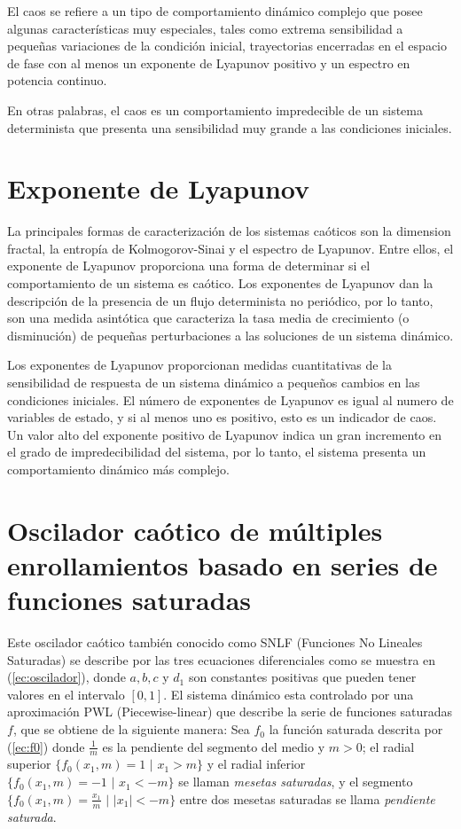\documentclass[10pt,a4paper]{article}
\begin{document}
	El caos se refiere a un tipo de comportamiento dinámico complejo que posee algunas características muy especiales, tales como extrema sensibilidad a pequeñas variaciones de la condición inicial, trayectorias encerradas en el espacio de fase con al menos un exponente de Lyapunov positivo y un espectro en potencia continuo.
	
	En otras palabras, el caos es un comportamiento impredecible de un sistema determinista que presenta una sensibilidad muy grande a las condiciones iniciales.
	
	\section{Exponente de Lyapunov}
	
	La principales formas de caracterización de los sistemas caóticos son la dimension fractal, la entropía de Kolmogorov-Sinai y el espectro de Lyapunov. Entre ellos, el exponente de Lyapunov proporciona una forma de determinar si el comportamiento de un sistema es caótico. Los exponentes de Lyapunov dan la descripción  de la presencia de un flujo determinista no periódico, por lo tanto, son una medida asintótica que caracteriza la tasa media de crecimiento (o disminución) de pequeñas
perturbaciones a las soluciones de un sistema dinámico. 

Los exponentes de Lyapunov proporcionan medidas cuantitativas de la sensibilidad de respuesta de un sistema dinámico a pequeños cambios en las condiciones iniciales. El número de exponentes de Lyapunov es igual al numero de variables de estado, y si al menos uno
es positivo, esto es un indicador de caos. Un valor alto del exponente positivo de Lyapunov indica un gran incremento en el grado de impredecibilidad del sistema, por lo tanto, el sistema presenta un comportamiento dinámico más complejo.

\section{Oscilador caótico de múltiples enrollamientos basado en series de funciones saturadas}

	Este oscilador caótico también conocido como SNLF (Funciones No Lineales Saturadas) se describe por las tres ecuaciones diferenciales como se muestra en (\ref{ec:oscilador}), donde $a, b, c$ y $d_{1}$ son constantes positivas que pueden tener valores en el intervalo $[0,1]$. El sistema dinámico esta controlado por una aproximación PWL (Piecewise-linear) que describe la serie de  funciones saturadas  $f$, que se obtiene de la siguiente manera: Sea $f_{0}$ la función saturada descrita por (\ref{ec:f0}) donde $\frac{1}{m}$ es la pendiente del segmento del medio y $m>0$; el radial superior $\{  f_{0}(x_{1},m) = 1 \,\,|\,\, x_{1} > m\}$ y el radial inferior $\{  f_{0}(x_{1},m) = -1 \,\,|\,\, x_{1} < -m\}$ se llaman \textit{mesetas saturadas}, y el segmento $\{  f_{0}(x_{1},m) = \frac{x_{1}}{m} \,\,|\,\, |x_{1}| < -m\}$ entre dos mesetas saturadas se llama \textit{pendiente saturada}.
	
\end{document}

